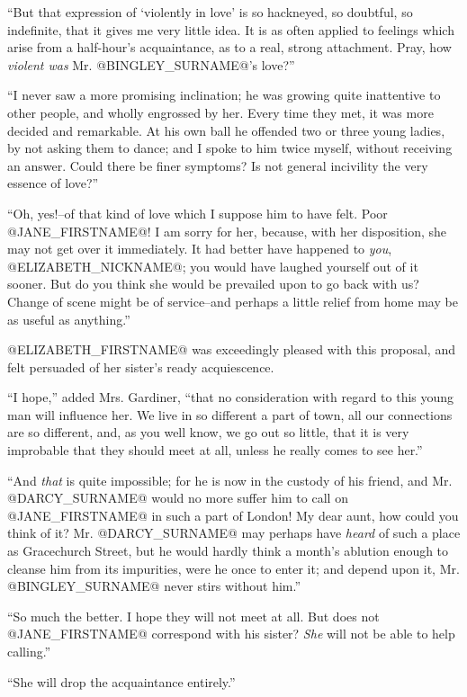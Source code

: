 ``But that expression of `violently in love' is so hackneyed, so
doubtful, so indefinite, that it gives me very little idea. It is as
often applied to feelings which arise from a half-hour's acquaintance,
as to a real, strong attachment. Pray, how \textit{violent was} Mr. @BINGLEY_SURNAME@'s
love?''

``I never saw a more promising inclination; he was growing quite
inattentive to other people, and wholly engrossed by her. Every time
they met, it was more decided and remarkable. At his own ball he
offended two or three young ladies, by not asking them to dance; and I
spoke to him twice myself, without receiving an answer. Could there be
finer symptoms? Is not general incivility the very essence of love?''

``Oh, yes!--of that kind of love which I suppose him to have felt. Poor
@JANE_FIRSTNAME@! I am sorry for her, because, with her disposition, she may not get
over it immediately. It had better have happened to \textit{you}, @ELIZABETH_NICKNAME@; you
would have laughed yourself out of it sooner. But do you think she
would be prevailed upon to go back with us? Change of scene might be
of service--and perhaps a little relief from home may be as useful as
anything.''

@ELIZABETH_FIRSTNAME@ was exceedingly pleased with this proposal, and felt persuaded
of her sister's ready acquiescence.

``I hope,'' added Mrs. Gardiner, ``that no consideration with regard to
this young man will influence her. We live in so different a part of
town, all our connections are so different, and, as you well know, we go
out so little, that it is very improbable that they should meet at all,
unless he really comes to see her.''

``And \textit{that} is quite impossible; for he is now in the custody of his
friend, and Mr. @DARCY_SURNAME@ would no more suffer him to call on @JANE_FIRSTNAME@ in such
a part of London! My dear aunt, how could you think of it? Mr. @DARCY_SURNAME@ may
perhaps have \textit{heard} of such a place as Gracechurch Street, but he
would hardly think a month's ablution enough to cleanse him from its
impurities, were he once to enter it; and depend upon it, Mr. @BINGLEY_SURNAME@
never stirs without him.''

``So much the better. I hope they will not meet at all. But does not @JANE_FIRSTNAME@
correspond with his sister? \textit{She} will not be able to help calling.''

``She will drop the acquaintance entirely.''

